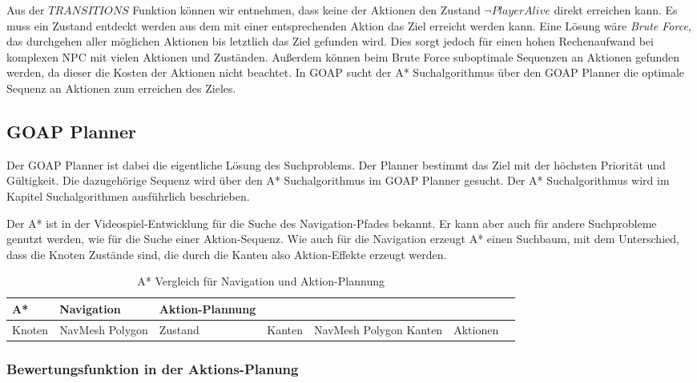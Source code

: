 Aus der $TRANSITIONS$ Funktion können wir entnehmen, dass keine der Aktionen den Zustand $\lnot PlayerAlive$ direkt erreichen kann. Es muss ein Zustand entdeckt werden aus dem mit einer entsprechenden Aktion das Ziel erreicht werden kann. Eine Lösung wäre \textit{Brute Force}, das durchgehen aller möglichen Aktionen bis letztlich das Ziel gefunden wird. Dies sorgt jedoch für einen hohen Rechenaufwand bei komplexen NPC mit vielen Aktionen und Zuständen. Außerdem können beim Brute Force suboptimale Sequenzen an Aktionen gefunden werden, da dieser die Kosten der Aktionen nicht beachtet. In GOAP sucht der A* Suchalgorithmus über den GOAP Planner die optimale Sequenz an Aktionen zum erreichen des Zieles.


\subsection{GOAP Planner}

Der GOAP Planner ist dabei die eigentliche Lösung des Suchproblems. Der Planner bestimmt das Ziel mit der höchsten Priorität und Gültigkeit. Die dazugehörige Sequenz wird über den A* Suchalgorithmus im GOAP Planner gesucht. Der A* Suchalgorithmus wird im Kapitel Suchalgorithmen ausführlich beschrieben.

Der A* ist in der Videospiel-Entwicklung für die Suche des Navigation-Pfades bekannt. Er kann aber auch für andere Suchprobleme genutzt werden, wie für die Suche einer Aktion-Sequenz. Wie auch für die Navigation erzeugt A* einen Suchbaum, mit dem Unterschied, dass die Knoten Zustände sind, die durch die Kanten also Aktion-Effekte erzeugt werden.

\begin{table}[h]
  \caption{A* Vergleich für Navigation und Aktion-Plannung}
  \label{A*: Vergleich}
  \renewcommand{\arraystretch}{1.2}
  \centering
  \small
    \begin{tabularx}{0.95\textwidth}{X X X}
      \toprule
      \textbf{A*} & \textbf{Navigation} & \textbf{Aktion-Plannung}\\
      \toprule
      Knoten & NavMesh Polygon & Zustand &
			Kanten & NavMesh Polygon Kanten & Aktionen &
      \bottomrule
    \end{tabularx}
\end{table}


\subsubsection{Bewertungsfunktion in der Aktions-Planung}

